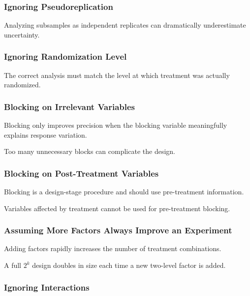 \subsubsection{Ignoring Pseudoreplication}

Analyzing subsamples as independent replicates can dramatically
underestimate uncertainty.

\subsubsection{Ignoring Randomization Level}

The correct analysis must match the level at which treatment was actually
randomized.

\subsubsection{Blocking on Irrelevant Variables}

Blocking only improves precision when the blocking variable meaningfully
explains response variation.

Too many unnecessary blocks can complicate the design.

\subsubsection{Blocking on Post-Treatment Variables}

Blocking is a design-stage procedure and should use pre-treatment
information.

Variables affected by treatment cannot be used for pre-treatment
blocking.

\subsubsection{Assuming More Factors Always Improve an Experiment}

Adding factors rapidly increases the number of treatment combinations.

A full \(2^k\) design doubles in size each time a new two-level factor is
added.

\subsubsection{Ignoring Interactions}

